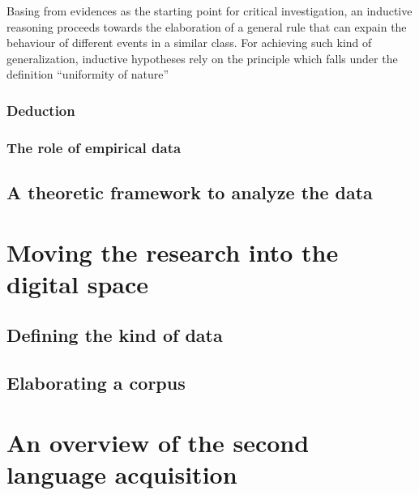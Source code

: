 \documentclass[
  a4paper,
  twoside,
  12pt,
  chapterprefix=false,
  bibliography=totocnumbered,
  listof=flat]{scrbook}
\begin{document}
Basing from evidences as the starting point for critical investigation, an inductive reasoning proceeds towards the elaboration of a general rule that can expain the behaviour of different events in a similar class. For achieving such kind of generalization, inductive hypotheses rely on the principle which falls under the definition ``uniformity of nature''

\hypertarget{deduction}{%
\subsection{Deduction}\label{deduction}}

\hypertarget{the-role-of-empirical-data}{%
\subsection{The role of empirical data}\label{the-role-of-empirical-data}}

\hypertarget{a-theoretic-framework-to-analyze-the-data}{%
\section{A theoretic framework to analyze the data}\label{a-theoretic-framework-to-analyze-the-data}}

\hypertarget{moving-the-research-into-the-digital-space}{%
\chapter{Moving the research into the digital space}\label{moving-the-research-into-the-digital-space}}

\hypertarget{defining-the-kind-of-data}{%
\section{Defining the kind of data}\label{defining-the-kind-of-data}}

\hypertarget{elaborating-a-corpus}{%
\section{Elaborating a corpus}\label{elaborating-a-corpus}}

\hypertarget{an-overview-of-the-second-language-acquisition}{%
\chapter{An overview of the second language acquisition}\label{an-overview-of-the-second-language-acquisition}}
\end{document}
